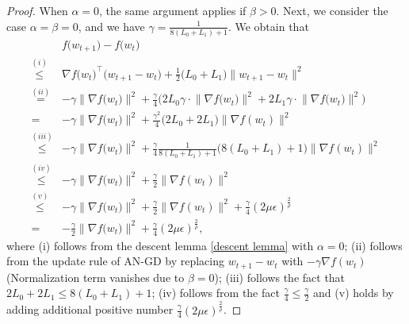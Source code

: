 \documentclass[10pt]{article} %
\newtheorem{proof}{Proof}
\begin{document}
\begin{proof}
When $\alpha=0$, the same argument applies if $\beta>0$. Next, we consider the case $\alpha =\beta =0$, and we have $\gamma = \frac{1}{8(L_0+L_1)+1}$. We obtain that
 \begin{align}
     & f\big(w_{t+1}\big)-f\big(w_t\big) \nonumber\\
\overset{(i)}{\leq}& \nabla f\big(w_t\big)^{\top}\big(w_{t+1}-w_t\big)+\frac{1}{2}\big(L_0+L_1\big)\big\|w_{t+1}-w_t\big\|^2 \nonumber\\
\overset{(ii)}{=}&-\gamma\big\|\nabla f\big(w_t\big)\big\|^{2}+\frac{\gamma}{4}\big(2 L_0 \gamma \cdot\big\|\nabla f\big(w_t\big)\big\|^{2}+2 L_1 \gamma \cdot\big\|\nabla f\big(w_t\big)\big\|^{2}\big) \nonumber\\
\overset{}{=}&-\gamma\big\|\nabla f\big(w_t\big)\big\|^{2} +\frac{\gamma^2}{4}\big(2L_0+2L_1\big)\big\|\nabla f(w_t) \big\|^2 \nonumber\\
\overset{(iii)}{\leq }&-{\gamma}\big\|\nabla f\big(w_t\big)\big\|^{2}+\frac{\gamma}{4}\frac{1}{8(L_0+L_1)+1}\big(8 (L_0+ L_1)+1\big) \big\|\nabla f(w_t) \big\|^2\nonumber\\
\overset{(iv)}{\leq}&-{\gamma}\big\|\nabla f\big(w_t\big)\big\|^{2}+\frac{\gamma}{2}\big \|\nabla f(w_t) \big \|^2 \nonumber\\
\overset{(v)}{\leq} &-{\gamma}\big\|\nabla f\big(w_t\big)\big\|^{2}+\frac{\gamma}{2}\big \|\nabla f(w_t) \big \|^2+\frac{\gamma}{4} (2\mu\epsilon)^{\frac{2}{\rho}} \nonumber\\
=& -\frac{\gamma}{2}\big\|\nabla f\big(w_t\big)\big\|^{2}+\frac{\gamma}{4} (2\mu\epsilon)^{\frac{2}{\rho}},
\end{align}
where (i) follows from the descent lemma \ref{descent lemma} with $\alpha=0$; (ii) follows from the update rule of AN-GD by replacing $w_{t+1}-w_t$ with $-\gamma \nabla f(w_t)$ (Normalization term vanishes due to $\beta=0$); (iii) follows the fact that $2L_0+2L_1\leq 8(L_0+L_1)+1$;
(iv) follows from the fact $\frac{\gamma}{4}\leq \frac{\gamma}{2}$ and (v) holds by adding additional positive number $\frac{\gamma}{4} (2\mu\epsilon)^{\frac{2}{\rho}}$.


\end{proof}
\end{document}
